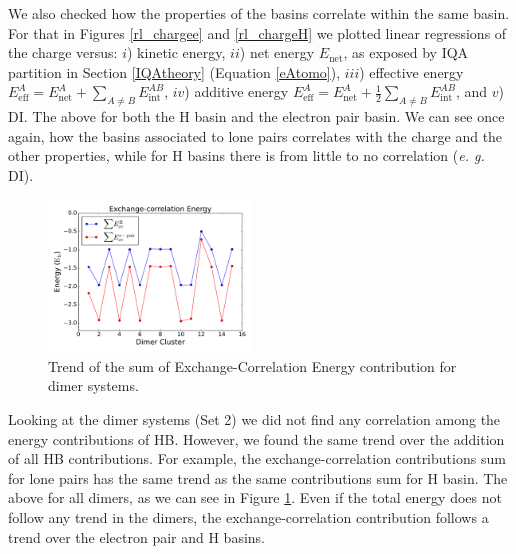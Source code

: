 \pagebreak

We also checked how the properties of the basins correlate within the same
basin. For that in Figures \ref{rl_chargee} and \ref{rl_chargeH} we plotted
linear regressions of the charge versus:
$i$) kinetic energy,%
$ii$) net energy $E_{\mathrm{net}}$, as exposed by IQA partition in Section \ref{IQAtheory} (Equation \ref{eAtomo}),
$iii$) effective energy $E_{\mathrm{eff}}^A=E_{\mathrm{net}}^A + \sum_{A\neq B}E_{\mathrm{int}}^{AB}$,
$iv$) additive energy $E_{\mathrm{eff}}^A=E_{\mathrm{net}}^A + \frac12 \sum_{A\neq B}E_{\mathrm{int}}^{AB}$, %
and $v$) DI.
The above for both the H basin and the electron pair basin.
We can see once again, how the basins associated to lone pairs correlates
with the charge and the other properties, while for
H basins there is from little to no correlation (\textit{e. g.} DI).


%

\begin{figure}
    \centering
    \includegraphics[width=0.48\textwidth]{4/plots/promelf/xc1_xc2.pdf}
    \caption{Trend of the sum of Exchange-Correlation Energy contribution
    for dimer systems.}
\label{xcHxcE}
\end{figure}


Looking at the dimer systems (Set 2) we did not find any correlation among the
energy contributions of HB. However, we found the same trend over the addition
of all HB contributions.  For example, the exchange-correlation contributions
sum for lone pairs has the same trend as the same contributions sum for H
basin. The above for all dimers, as we can see in Figure \ref{xcHxcE}.  Even if
the total energy does not follow any trend in the dimers, the
exchange-correlation contribution follows a trend over the electron pair and H
basins.

